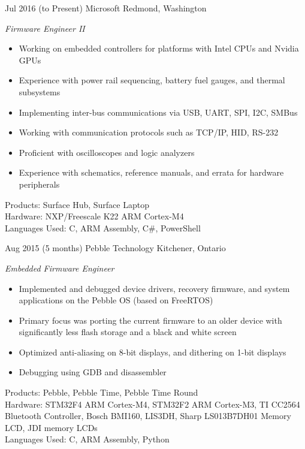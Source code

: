 \documentclass[print]{friggeri-cv} %
\begin{document}
\begin{entrylist}

\entry
{Jul 2016}
{(to Present)}
{Microsoft}
{Redmond, Washington}
{\emph{Firmware Engineer II}
\begin{itemize}
\item Working on embedded controllers for platforms with Intel CPUs and Nvidia GPUs
\item Experience with power rail sequencing, battery fuel gauges, and thermal subsystems
\item Implementing inter-bus communications via USB, UART, SPI, I2C, SMBus
\item Working with communication protocols such as TCP/IP, HID, RS-232
\item Proficient with oscilloscopes and logic analyzers
\item Experience with schematics, reference manuals, and errata for hardware peripherals
\end{itemize}
Products: Surface Hub, Surface Laptop \\
Hardware: NXP/Freescale K22 ARM Cortex-M4 \\
Languages Used: C, ARM Assembly, C\#, PowerShell \\
}

\entry
{Aug 2015}
{(5 months)}
{Pebble Technology}
{Kitchener, Ontario}
{\emph{Embedded Firmware Engineer}
\begin{itemize}
\item Implemented and debugged device drivers, recovery firmware, and system applications on the Pebble OS (based on FreeRTOS)
\item Primary focus was porting the current firmware to an older device with significantly less flash storage and a black and white screen
\item Optimized anti-aliasing on 8-bit displays, and dithering on 1-bit displays
\item Debugging using GDB and disassembler 
\end{itemize}
Products: Pebble, Pebble Time, Pebble Time Round \\
Hardware: STM32F4 ARM Cortex-M4, STM32F2 ARM Cortex-M3, TI CC2564 Bluetooth Controller, Bosch BMI160, LIS3DH, Sharp LS013B7DH01 Memory LCD, JDI memory LCDs \\
Languages Used: C, ARM Assembly, Python \\
}


\end{entrylist}
\end{document}
